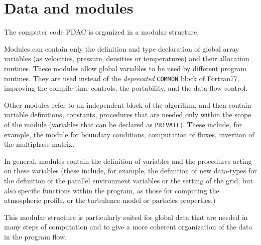 \section{Data and modules}
The computer code PDAC is organized in a modular structure.

Modules can contain only the definition and type declaration
of global array variables (as velocities, pressure, densities or
temperatures) and their allocation routines. These modules allow
global variables to be used by different program routines. They are
used instead of the {\em deprecated} {\tt COMMON} block of Fortran77, improving
the compile-time controls, the portability, and the data-flow control.

Other modules refer to an independent block of the algorithm, and then contain
variable definitions, constants, procedures that are needed only
within the scope of the module (variables that can be declared as {\tt PRIVATE}). 
These include, for example, the module for boundary conditions, computation 
of fluxes, invertion of the multiphase matrix.

In general, modules contain the definition of variables 
and the procedures acting on these variables (these include,
for example, the definition of new data-types for the definition of 
the parallel environment variables or the setting of the grid, but also
specific functions within the program, as those for computing the atmospheric 
profile, or the turbulence model or particles properties.)

 This modular structure is particularly suited for global
data that are needed in many steps of computation and to give a more 
coherent organization of the data in the program flow.

